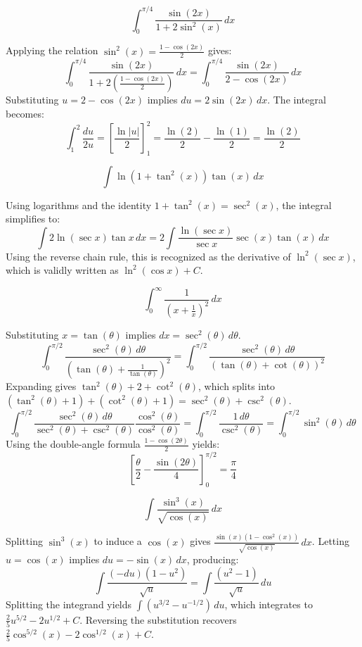 \begin{questions}
    \question \[ \int_{0}^{\pi/4}\frac{\sin(2x)}{1+2\sin^{2}(x)} \,dx \]
    \begin{solution}
        Applying the relation $\sin^{2}(x)=\frac{1-\cos(2x)}{2}$ gives:
        \[ \int_{0}^{\pi/4}\frac{\sin(2x)}{1+2\left(\frac{1-\cos(2x)}{2}\right)} \,dx = \int_{0}^{\pi/4}\frac{\sin(2x)}{2-\cos(2x)} \,dx \]
        Substituting $u=2-\cos(2x)$ implies $du=2\sin(2x) \,dx$. The integral becomes:
        \[ \int_{1}^{2}\frac{du}{2u} = \left[ \frac{\ln|u|}{2} \right]_{1}^{2} = \frac{\ln(2)}{2} - \frac{\ln(1)}{2} = \frac{\ln(2)}{2} \]
    \end{solution}

    \question \[ \int\ln(1+\tan^{2}(x))\tan(x) \,dx \]
    \begin{solution}
        Using logarithms and the identity $1+\tan^{2}(x)=\sec^{2}(x)$, the integral simplifies to:
        \[ \int 2\ln(\sec x)\tan x \,dx = 2\int\frac{\ln(\sec x)}{\sec x}\sec(x)\tan(x) \,dx \]
        Using the reverse chain rule, this is recognized as the derivative of $\ln^{2}(\sec x)$, which is validly written as $\ln^{2}(\cos x)+C$.
    \end{solution}

    \question \[ \int_{0}^{\infty}\frac{1}{\left(x+\frac{1}{x}\right)^{2}} \,dx \]
    \begin{solution}
        Substituting $x=\tan(\theta)$ implies $dx=\sec^{2}(\theta) \,d\theta$.
        \[ \int_{0}^{\pi/2}\frac{\sec^{2}(\theta) \,d\theta}{\left(\tan(\theta)+\frac{1}{\tan(\theta)}\right)^{2}} = \int_{0}^{\pi/2}\frac{\sec^{2}(\theta) \,d\theta}{(\tan(\theta)+\cot(\theta))^{2}} \]
        Expanding gives $\tan^{2}(\theta)+2+\cot^{2}(\theta)$, which splits into $(\tan^{2}(\theta)+1)+(\cot^{2}(\theta)+1) = \sec^{2}(\theta)+\csc^{2}(\theta)$.
        \[ \int_{0}^{\pi/2}\frac{\sec^{2}(\theta) \,d\theta}{\sec^{2}(\theta)+\csc^{2}(\theta)}\frac{\cos^{2}(\theta)}{\cos^{2}(\theta)} = \int_{0}^{\pi/2}\frac{1 \,d\theta}{\csc^{2}(\theta)} = \int_{0}^{\pi/2}\sin^{2}(\theta) \,d\theta \]
        Using the double-angle formula $\frac{1-\cos(2\theta)}{2}$ yields:
        \[ \left[ \frac{\theta}{2} - \frac{\sin(2\theta)}{4} \right]_{0}^{\pi/2} = \frac{\pi}{4} \]
    \end{solution}

    \question \[ \int\frac{\sin^{3}(x)}{\sqrt{\cos(x)}} \,dx \]
    \begin{solution}
        Splitting $\sin^{3}(x)$ to induce a $\cos(x)$ gives $\frac{\sin(x)(1-\cos^{2}(x))}{\sqrt{\cos(x)}} \,dx$.
        Letting $u=\cos(x)$ implies $du=-\sin(x) \,dx$, producing:
        \[ \int\frac{(-du)(1-u^{2})}{\sqrt{u}} = \int\frac{(u^{2}-1)}{\sqrt{u}} \,du \]
        Splitting the integrand yields $\int (u^{3/2}-u^{-1/2}) \,du$, which integrates to $\frac{2}{5}u^{5/2}-2u^{1/2}+C$. Reversing the substitution recovers $\frac{2}{5}\cos^{5/2}(x)-2\cos^{1/2}(x)+C$.
    \end{solution}


\end{questions}
